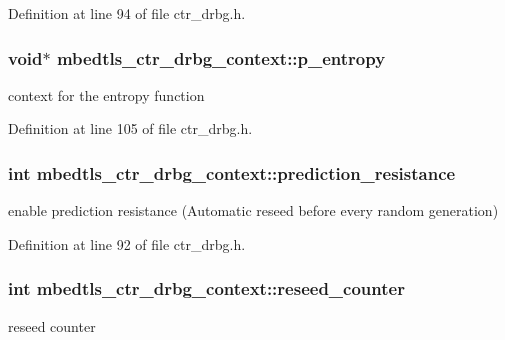 Definition at line 94 of file ctr\-\_\-drbg.\-h.

\hypertarget{structmbedtls__ctr__drbg__context_a85ca46b24fc75d3d1c091835c8c2e0b4}{
\subsubsection[{p\-\_\-entropy}]{\setlength{\rightskip}{0pt plus 5cm}void$\ast$ mbedtls\-\_\-ctr\-\_\-drbg\-\_\-context\-::p\-\_\-entropy}}\label{structmbedtls__ctr__drbg__context_a85ca46b24fc75d3d1c091835c8c2e0b4}
context for the entropy function 

Definition at line 105 of file ctr\-\_\-drbg.\-h.

\hypertarget{structmbedtls__ctr__drbg__context_ae521e373913548f732e0cdfe3e82d2ac}{
\subsubsection[{prediction\-\_\-resistance}]{\setlength{\rightskip}{0pt plus 5cm}int mbedtls\-\_\-ctr\-\_\-drbg\-\_\-context\-::prediction\-\_\-resistance}}\label{structmbedtls__ctr__drbg__context_ae521e373913548f732e0cdfe3e82d2ac}
enable prediction resistance (Automatic reseed before every random generation) 

Definition at line 92 of file ctr\-\_\-drbg.\-h.

\hypertarget{structmbedtls__ctr__drbg__context_abdbeba1194553f4f1a3534712dc0c9f9}{
\subsubsection[{reseed\-\_\-counter}]{\setlength{\rightskip}{0pt plus 5cm}int mbedtls\-\_\-ctr\-\_\-drbg\-\_\-context\-::reseed\-\_\-counter}}\label{structmbedtls__ctr__drbg__context_abdbeba1194553f4f1a3534712dc0c9f9}
reseed counter 

